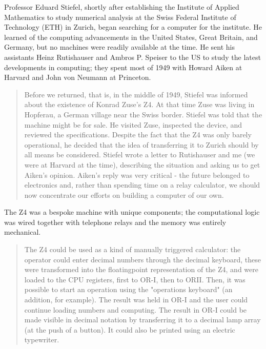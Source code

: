 Professor Eduard Stiefel, shortly after establishing the Institute of Applied Mathematics
to study numerical analysis at the Swiss Federal Institute of Technology (ETH) in Zurich,
began searching for a computer for the institute.
He learned of the computing advancements in the United States, Great Britain, and Germany,
but no machines were readily available at the time.
He sent his assistants Heinz Rutishauser and Ambros P. Speiser to the US to study
the latest developments in computing; they spent most of 1949 with
Howard Aiken at Harvard and John von Neumann at Princeton.

\begin{quotation}
Before we returned, that is, in the middle of 1949, Stiefel was informed about the existence of Konrad Zuse's
Z4. At that time Zuse was living in Hopferau, a German village near the Swiss border. Stiefel was told that
the machine might be for sale. He visited Zuse, inspected the device, and reviewed the specifications.
Despite the fact that the Z4 was only barely operational, he decided that the idea of transferring it to Zurich
should by all means be considered. Stiefel wrote a letter to Rutishauser and me (we were at Harvard at the
time), describing the situation and asking us to get Aiken's opinion. Aiken's reply was very critical - the
future belonged to electronics and, rather than spending time on a relay calculator, we should now
concentrate our efforts on building a computer of our own.\cite{konrad-zuses-z4-2000}
\end{quotation}

The Z4 was a bespoke machine with unique components; the computational logic was wired together with
telephone relays and the memory was entirely mechanical.

\begin{quotation}
The Z4 could be used as a kind of manually triggered calculator: the operator 
could enter decimal numbers through the decimal keyboard, these were 
transformed into the floatingpoint representation of the Z4, and were loaded to 
the CPU registers, first to OR-I, then to ORII. Then, it was possible to start 
an operation using the "operations keyboard" (an addition, for example). The 
result was held in OR-I and the user could continue loading numbers and 
computing. The result in OR-I could be made visible in decimal notation by 
transferring it to a decimal lamp array (at the push of a button). It could 
also be printed using an electric typewriter. \cite{architecture-of-konrad-zuses-z4-computer-2021}
\end{quotation}

